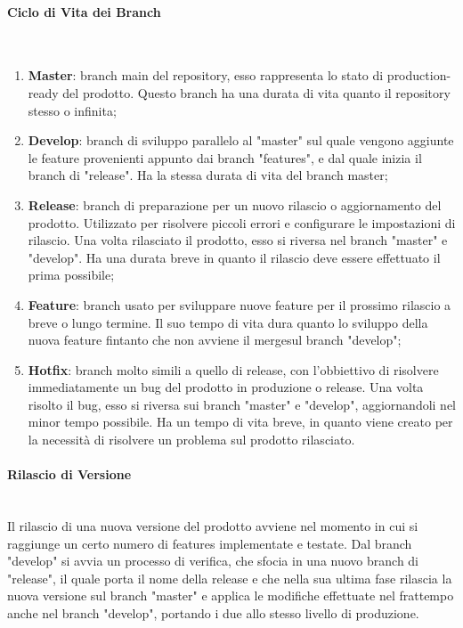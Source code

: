\paragraph{Ciclo di Vita dei Branch} \-\\
\begin{enumerate}
	
	\item \textbf{Master}: branch main del repository, esso rappresenta lo stato di production-ready del prodotto. Questo branch ha una durata di vita quanto il repository stesso o infinita;
	\item \textbf{Develop}: branch di sviluppo parallelo al "master" sul quale vengono aggiunte le feature provenienti appunto dai branch "features", e dal quale inizia il branch di "release". Ha la stessa durata di vita del branch master;
	 
	\item \textbf{Release}: branch di preparazione per un nuovo rilascio o aggiornamento del prodotto. 
	Utilizzato per risolvere piccoli errori e configurare le impostazioni di rilascio. Una volta rilasciato il 
	prodotto, esso si riversa nel branch "master" e "develop". Ha una durata breve in quanto il rilascio deve essere effettuato il prima possibile;

	\item \textbf{Feature}: branch usato per sviluppare nuove feature per il prossimo rilascio a breve o lungo termine. Il suo tempo di vita dura quanto lo sviluppo della nuova feature
	fintanto che non avviene il merge\glossario sul branch "develop";

	\item \textbf{Hotfix}: branch molto simili a quello di release, con l'obbiettivo di risolvere immediatamente un bug del prodotto in produzione o release. Una volta risolto il bug, 
	esso si riversa sui branch "master" e "develop", aggiornandoli nel minor tempo possibile. Ha un tempo di vita breve, in quanto viene creato per la necessità di risolvere 
	un problema sul prodotto rilasciato. 
	
\end{enumerate}


\paragraph{Rilascio di Versione} \-\\
Il rilascio di una nuova versione del prodotto avviene nel momento in cui si raggiunge un certo numero di features implementate e testate. 
Dal branch "develop" si avvia un processo di verifica, che sfocia in una nuovo branch di "release", il quale porta il nome della release e che nella sua ultima fase rilascia la nuova versione sul branch "master" e applica le modifiche effettuate nel frattempo anche nel branch "develop", portando i due allo stesso livello di produzione. 


